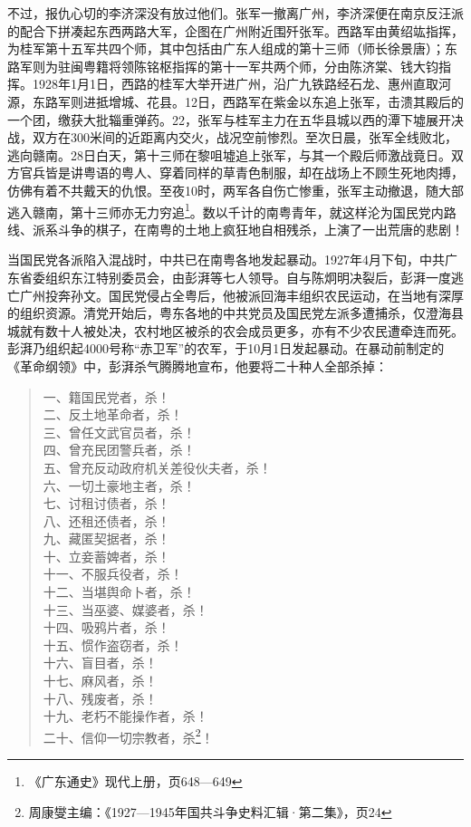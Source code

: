 不过，报仇心切的李济深没有放过他们。张军一撤离广州，李济深便在南京反汪派的配合下拼凑起东西两路大军，企图在广州附近围歼张军。西路军由黄绍竑指挥，为桂军第十五军共四个师，其中包括由广东人组成的第十三师（师长徐景唐）；东路军则为驻闽粤籍将领陈铭枢指挥的第十一军共两个师，分由陈济棠、钱大钧指挥。1928年1月1日，西路的桂军大举开进广州，沿广九铁路经石龙、惠州直取河源，东路军则进抵增城、花县。12日，西路军在紫金以东追上张军，击溃其殿后的一个团，缴获大批辎重弹药。22，张军与桂军主力在五华县城以西的潭下墟展开决战，双方在300米间的近距离内交火，战况空前惨烈。至次日晨，张军全线败北，逃向赣南。28日白天，第十三师在黎咀墟追上张军，与其一个殿后师激战竟日。双方官兵皆是讲粤语的粤人、穿着同样的草青色制服，却在战场上不顾生死地肉搏，仿佛有着不共戴天的仇恨。至夜10时，两军各自伤亡惨重，张军主动撤退，随大部逃入赣南，第十三师亦无力穷追\footnote{《广东通史》现代上册，页648—649}。数以千计的南粤青年，就这样沦为国民党内路线、派系斗争的棋子，在南粤的土地上疯狂地自相残杀，上演了一出荒唐的悲剧！

当国民党各派陷入混战时，中共已在南粤各地发起暴动。1927年4月下旬，中共广东省委组织东江特别委员会，由彭湃等七人领导。自与陈炯明决裂后，彭湃一度逃亡广州投奔孙文。国民党侵占全粤后，他被派回海丰组织农民运动，在当地有深厚的组织资源。清党开始后，粤东各地的中共党员及国民党左派多遭捕杀，仅澄海县城就有数十人被处决，农村地区被杀的农会成员更多，亦有不少农民遭牵连而死。彭湃乃组织起4000号称“赤卫军”的农军，于10月1日发起暴动。在暴动前制定的《革命纲领》中，彭湃杀气腾腾地宣布，他要将二十种人全部杀掉：

\begin{quote}
一、籍国民党者，杀！\\
二、反土地革命者，杀！\\
三、曾任文武官员者，杀！\\
四、曾充民团警兵者，杀！\\
五、曾充反动政府机关差役伙夫者，杀！\\
六、一切土豪地主者，杀！\\
七、讨租讨债者，杀！\\
八、还租还债者，杀！\\
九、藏匿契据者，杀！\\
十、立妾蓄婢者，杀！\\
十一、不服兵役者，杀！\\
十二、当堪舆命卜者，杀！\\
十三、当巫婆、媒婆者，杀！\\
十四、吸鸦片者，杀！\\
十五、惯作盗窃者，杀！\\
十六、盲目者，杀！\\
十七、麻风者，杀！\\
十八、残废者，杀！\\
十九、老朽不能操作者，杀！\\
二十、信仰一切宗教者，杀\footnote{周康燮主编：《1927—1945年国共斗争史料汇辑·第二集》，页24}！
\end{quote}


